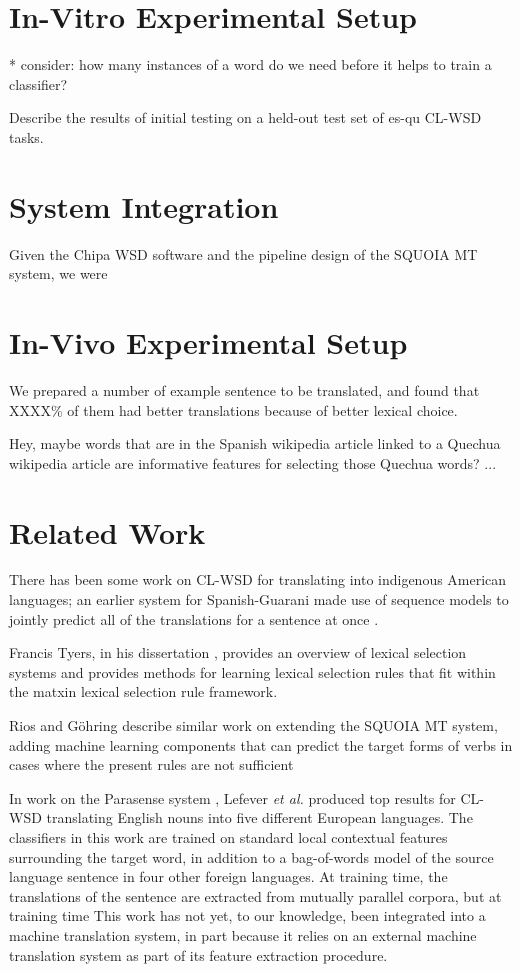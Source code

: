 \documentclass[10pt, a4paper]{article}
\begin{document}
\section{In-Vitro Experimental Setup}
* consider: how many instances of a word do we need before it helps to train a
classifier?


Describe the results of initial testing on a held-out test set of es-qu CL-WSD
tasks.


\section{System Integration}
Given the Chipa WSD software and the pipeline design of the SQUOIA MT system,
we were


\section{In-Vivo Experimental Setup}
We prepared a number of example sentence to be translated, and found that
XXXX\% of them had better translations because of better lexical choice.


Hey, maybe words that are in the Spanish wikipedia article linked to a Quechua
wikipedia article are informative features for selecting those Quechua words?
...

\section{Related Work}

There has been some work on CL-WSD for translating into indigenous American
languages; an earlier system for Spanish-Guarani made use of sequence models to
jointly predict all of the translations for a sentence at once
\cite{rudnick-gasser:2013:HyTra}.

Francis Tyers, in his dissertation \cite{tyers-dissertation}, provides an
overview of lexical selection systems and provides methods for learning lexical
selection rules that fit within the %
matxin lexical selection rule framework.

Rios and G\"{o}hring  describe
similar work on extending the SQUOIA MT system, adding machine learning
components that can predict the target forms of verbs in cases where the
present rules are not sufficient 

In work on the Parasense system \cite{lefever-hoste-decock:2011:ACL-HLT2011},
Lefever \emph{et al.} produced top results for CL-WSD translating English nouns
into five different European languages. The classifiers in this work are
trained on standard local contextual features surrounding the target word,
in addition to a bag-of-words model of the source language sentence in four
other foreign languages. At training time, the translations of the sentence are
extracted from mutually parallel corpora, %
but at training time
This work has not yet, to our knowledge, been integrated into a machine
translation system, in part because it relies on an external machine
translation system as part of its feature extraction procedure.
\end{document}
